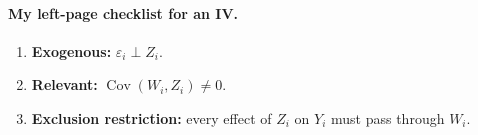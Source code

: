 \documentclass[11pt,a4paper]{article}
\begin{document}
\paragraph{My left-page checklist for an IV.}
\begin{enumerate}
 \item \textbf{Exogenous:} $\varepsilon_i\perp Z_i$.
 \item \textbf{Relevant:} $\operatorname{Cov}(W_i,Z_i)\ne0$.
 \item \textbf{Exclusion restriction:} every effect of $Z_i$ on $Y_i$ must pass through $W_i$.
\end{enumerate}
\begin{center}\end{center}

\end{document}
